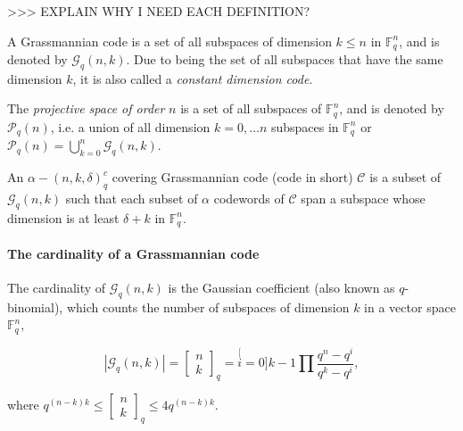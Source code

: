 >\textcompwordmark >\textcompwordmark > EXPLAIN WHY I NEED EACH
DEFINITION?
\begin{defn}
 A Grassmannian code is a set of all subspaces of dimension $k\leq n$
in $\ensuremath{\mathbb{F}}_{q}^{n}$, and is denoted by $\mathcal{G}_{q}\left(n,k\right)$.
Due to being the set of all subspaces that have the same dimension
$k$, it is also called a \textit{constant dimension code}. \cite{Zhang:2019}
\end{defn}
%
\begin{defn}
 The \textit{projective space of order} $n$ is a set of all subspaces
of $\ensuremath{\mathbb{F}}_{q}^{n}$, and is denoted by $\mathcal{P}_{q}\left(n\right)$,
i.e. a union of all dimension $k=0,\ldots n$ subspaces in $\ensuremath{\mathbb{F}}_{q}^{n}$
or $\mathcal{P}_{q}\left(n\right)=\bigcup_{k=0}^{n}\mathcal{G}_{q}\left(n,k\right)$.
\cite{Wachter-Zeh:2018}
\end{defn}
%
\begin{defn}
 An $\alpha-\left(n,k,\delta\right)_{q}^{c}$ covering Grassmannian
code (code in short) $\mathcal{C}$ is a subset of $\mathcal{G}_{q}\left(n,k\right)$
such that each subset of $\alpha$ codewords of $\mathcal{C}$ span
a subspace whose dimension is at least $\delta+k$ in $\ensuremath{\mathbb{F}}_{q}^{n}$.
\cite{Zhang:2019}
\end{defn}

\paragraph{The cardinality of a Grassmannian code}

The cardinality of $\mathcal{G}_{q}\left(n,k\right)$ is the Gaussian
coefficient (also known as $q$-binomial), which counts the number
of subspaces of dimension $k$ in a vector space $\ensuremath{\mathbb{F}}_{q}^{n}$,

\[
\left|\mathcal{G}_{q}\left(n,k\right)\right|=\left[\begin{array}{c}
n\\
k
\end{array}\right]_{q}=\stackrel[i=0]{k-1}{\prod}\frac{q^{n}-q^{i}}{q^{k}-q^{i}},
\]

where $q^{\left(n-k\right)k}\leq\left[\begin{array}{c}
n\\
k
\end{array}\right]_{q}\leq4q^{\left(n-k\right)k}$.

